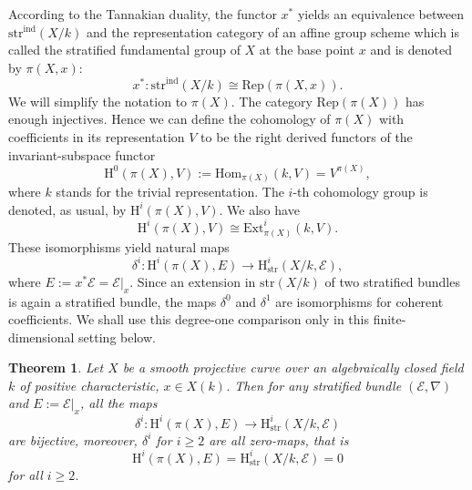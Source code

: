 \documentclass[12pt,a4]{amsart}
\newtheorem{thm}[claim]{Theorem}
\theoremstyle{definition}
\begin{document}
According to the Tannakian duality, the functor $x^*$
yields an equivalence between $\mathrm{str}^\mathrm{ind}(X/k)$ 
and the representation category of an affine group scheme which is called the
stratified fundamental group of $X$ at the base point $x$ and is denoted
by $\pi(X,x)$:
$$x^*: \mathrm{str}^\mathrm{ind}(X/k) \cong \mathrm{Rep}(\pi(X,x)).$$
We will simplify the notation to $\pi(X)$. 
The category  $\mathrm{Rep}(\pi(X))$ has enough injectives. Hence
we can define the cohomology of $\pi(X)$ with coefficients in its representation $V$ to be
the right derived functors of the invariant-subspace functor
$$\mathrm{H}^0(\pi(X),V):=\mathrm{Hom}_{\pi(X)}
(k,V)=V^{\pi(X)},$$
where $k$ stands for the trivial representation. The $i$-th cohomology
group is denoted, as usual, by $\mathrm{H}^i(\pi(X),V)$.
We also have
$$\mathrm{H}^i(\pi(X),V)\cong \mathrm{Ext}^i_{\pi(X)}(k,V).$$
These isomorphisms yield natural maps
$$\delta^i: \mathrm{H}^i(\pi(X),E)\longrightarrow 
\mathrm{H}^i_\text{str}(X/k,\mathcal E),$$
where $E:=x^*\mathcal E=\mathcal E|_x.$ 
Since an extension in $\mathrm{str}(X/k)$ of two stratified bundles is again a stratified bundle, the maps $\delta^0$ and $\delta^1$ are isomorphisms for coherent coefficients. We shall use this degree-one comparison only in this finite-dimensional setting below.

\begin{thm}\label{thm_delta_stratified}
Let $X$ be a smooth projective curve over an algebraically closed
field $k$ of positive characteristic, $x\in X(k)$. Then for any stratified bundle 
$(\mathcal E,\nabla)$ and $E:=\mathcal E|_x$, all the maps
$$\delta^i: \mathrm{H}^i(\pi(X),E)\longrightarrow 
\mathrm{H}^i_\mathrm{str}(X/k,\mathcal E)$$
are bijective, moreover, $\delta^i$ for $i\geq 2$ are all zero-maps, that is
$$\mathrm{H}^i(\pi(X),E)=
\mathrm{H}^i_\mathrm{str}(X/k,\mathcal E)=0$$
for all $i\geq 2$. 
\end{thm}
\end{document}
